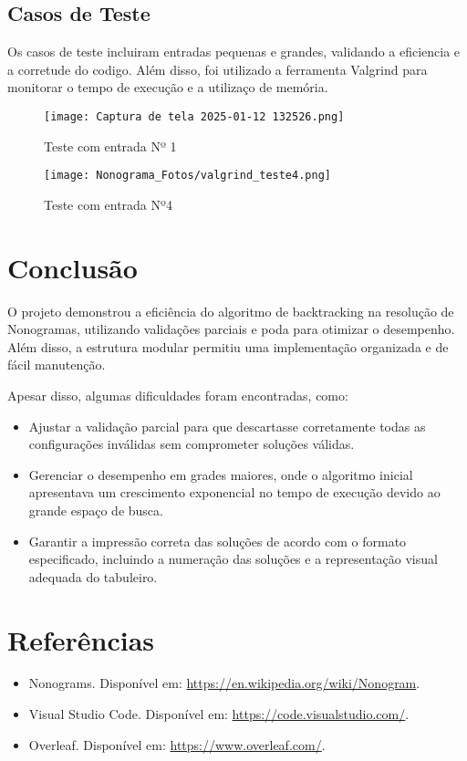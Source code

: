 \documentclass[a4paper,12pt]{article}
\begin{document}
\subsection{Casos de Teste}
Os casos de teste incluiram entradas pequenas e grandes, validando a eficiencia e a corretude do codigo. Além disso, foi utilizado a ferramenta Valgrind para monitorar o tempo de execução e a utilizaço de memória.

\begin{figure}[H]
    \centering
    \texttt{[image: Captura de tela 2025-01-12 132526.png]}
    \caption{Teste com entrada Nº 1}
\end{figure}

\begin{figure}[H]
    \centering
    \texttt{[image: Nonograma\_Fotos/valgrind\_teste4.png]}
    \caption{Teste com entrada Nº4}
\end{figure}

\section{Conclus\~ao}
O projeto demonstrou a efici\^encia do algoritmo de backtracking na resolu\c{c}\~ao de Nonogramas, utilizando valida\c{c}\~oes parciais e poda para otimizar o desempenho. Al\'em disso, a estrutura modular permitiu uma implementa\c{c}\~ao organizada e de f\'acil manuten\c{c}\~ao.

Apesar disso, algumas dificuldades foram encontradas, como:
\begin{itemize}
    \item Ajustar a valida\c{c}\~ao parcial para que descartasse corretamente todas as configura\c{c}\~oes inv\'alidas sem comprometer solu\c{c}\~oes v\'alidas.
    \item Gerenciar o desempenho em grades maiores, onde o algoritmo inicial apresentava um crescimento exponencial no tempo de execu\c{c}\~ao devido ao grande espa\c{c}o de busca.
    \item Garantir a impress\~ao correta das solu\c{c}\~oes de acordo com o formato especificado, incluindo a numera\c{c}\~ao das solu\c{c}\~oes e a representa\c{c}\~ao visual adequada do tabuleiro.
\end{itemize}

\section{Refer\^encias}
\begin{itemize}
    \item Nonograms. Dispon\'ivel em: \url{https://en.wikipedia.org/wiki/Nonogram}.
    \item Visual Studio Code. Dispon\'ivel em: \url{https://code.visualstudio.com/}.
    \item Overleaf. Dispon\'ivel em: \url{https://www.overleaf.com/}.
\end{itemize}
\end{document}
